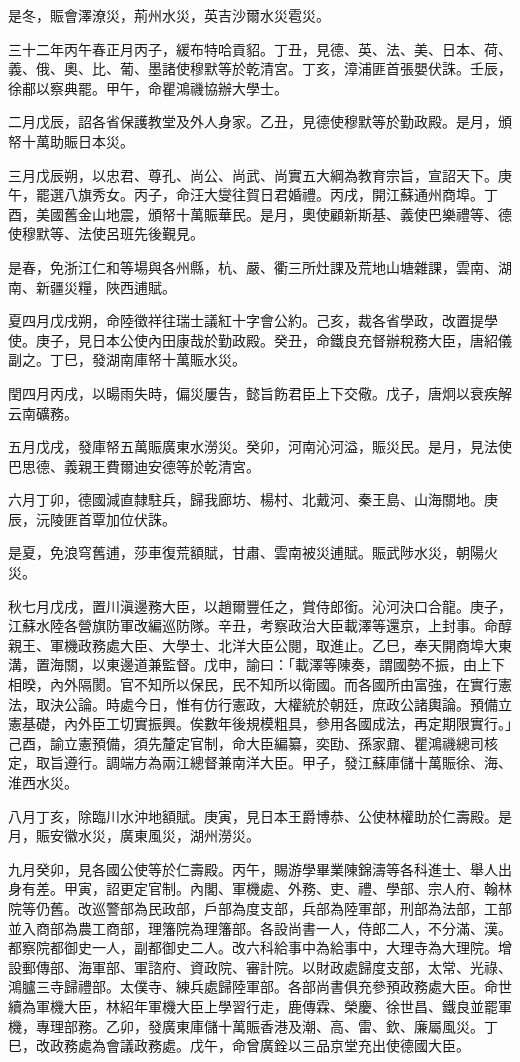 \begin{pinyinscope}
是冬，賑會澤潦災，荊州水災，英吉沙爾水災雹災。

三十二年丙午春正月丙子，緩布特哈貢貂。丁丑，見德、英、法、美、日本、荷、義、俄、奧、比、葡、墨諸使穆默等於乾清宮。丁亥，漳浦匪首張嬰伏誅。壬辰，徐郙以察典罷。甲午，命瞿鴻禨協辦大學士。

二月戊辰，詔各省保護教堂及外人身家。乙丑，見德使穆默等於勤政殿。是月，頒帑十萬助賑日本災。

三月戊辰朔，以忠君、尊孔、尚公、尚武、尚實五大綱為教育宗旨，宣詔天下。庚午，罷選八旗秀女。丙子，命汪大燮往賀日君婚禮。丙戌，開江蘇通州商埠。丁酉，美國舊金山地震，頒帑十萬賑華民。是月，奧使顧新斯基、義使巴樂禮等、德使穆默等、法使呂班先後覲見。

是春，免浙江仁和等場與各州縣，杭、嚴、衢三所灶課及荒地山塘雜課，雲南、湖南、新疆災糧，陜西逋賦。

夏四月戊戌朔，命陸徵祥往瑞士議紅十字會公約。己亥，裁各省學政，改置提學使。庚子，見日本公使內田康哉於勤政殿。癸丑，命鐵良充督辦稅務大臣，唐紹儀副之。丁巳，發湖南庫帑十萬賑水災。

閏四月丙戌，以暘雨失時，偏災屢告，懿旨飭君臣上下交儆。戊子，唐炯以衰疾解云南礦務。

五月戊戌，發庫帑五萬賑廣東水澇災。癸卯，河南沁河溢，賑災民。是月，見法使巴思德、義親王費爾迪安德等於乾清宮。

六月丁卯，德國減直隸駐兵，歸我廊坊、楊村、北戴河、秦王島、山海關地。庚辰，沅陵匪首覃加位伏誅。

是夏，免浪穹舊逋，莎車復荒額賦，甘肅、雲南被災逋賦。賑武陟水災，朝陽火災。

秋七月戊戌，置川滇邊務大臣，以趙爾豐任之，賞侍郎銜。沁河決口合龍。庚子，江蘇水陸各營旗防軍改編巡防隊。辛丑，考察政治大臣載澤等還京，上封事。命醇親王、軍機政務處大臣、大學士、北洋大臣公閱，取進止。乙巳，奉天開商埠大東溝，置海關，以東邊道兼監督。戊申，諭曰：「載澤等陳奏，謂國勢不振，由上下相暌，內外隔閡。官不知所以保民，民不知所以衛國。而各國所由富強，在實行憲法，取決公論。時處今日，惟有仿行憲政，大權統於朝廷，庶政公諸輿論。預備立憲基礎，內外臣工切實振興。俟數年後規模粗具，參用各國成法，再定期限實行。」己酉，諭立憲預備，須先釐定官制，命大臣編纂，奕劻、孫家鼐、瞿鴻禨總司核定，取旨遵行。調端方為兩江總督兼南洋大臣。甲子，發江蘇庫儲十萬賑徐、海、淮西水災。

八月丁亥，除臨川水沖地額賦。庚寅，見日本王爵博恭、公使林權助於仁壽殿。是月，賑安徽水災，廣東風災，湖州澇災。

九月癸卯，見各國公使等於仁壽殿。丙午，賜游學畢業陳錦濤等各科進士、舉人出身有差。甲寅，詔更定官制。內閣、軍機處、外務、吏、禮、學部、宗人府、翰林院等仍舊。改巡警部為民政部，戶部為度支部，兵部為陸軍部，刑部為法部，工部並入商部為農工商部，理籓院為理籓部。各設尚書一人，侍郎二人，不分滿、漢。都察院都御史一人，副都御史二人。改六科給事中為給事中，大理寺為大理院。增設郵傳部、海軍部、軍諮府、資政院、審計院。以財政處歸度支部，太常、光祿、鴻臚三寺歸禮部。太僕寺、練兵處歸陸軍部。各部尚書俱充參預政務處大臣。命世續為軍機大臣，林紹年軍機大臣上學習行走，鹿傳霖、榮慶、徐世昌、鐵良並罷軍機，專理部務。乙卯，發廣東庫儲十萬賑香港及潮、高、雷、欽、廉屬風災。丁巳，改政務處為會議政務處。戊午，命曾廣銓以三品京堂充出使德國大臣。


\end{pinyinscope}
